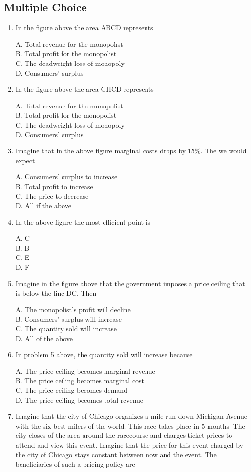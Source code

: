 \documentclass[
]{book}
\begin{document}
\hypertarget{multiple-choice-6}{%
\subsection{Multiple Choice}\label{multiple-choice-6}}

\begin{enumerate}
\def\labelenumi{\arabic{enumi}.}
\item
  In the figure above the area ABCD represents

  A. Total revenue for the monopolist\\
  B. Total profit for the monopolist\\
  C. The deadweight loss of monopoly\\
  D. Consumers' surplus
\item
  In the figure above the area GHCD represents

  A. Total revenue for the monopolist\\
  B. Total profit for the monopolist\\
  C. The deadweight loss of monopoly\\
  D. Consumers' surplus
\item
  Imagine that in the above figure marginal costs drops by 15\%. The we would expect

  A. Consumers' surplus to increase\\
  B. Total profit to increase\\
  C. The price to decrease\\
  D. All if the above
\item
  In the above figure the most efficient point is

  A. C\\
  B. B\\
  C. E\\
  D. F
\item
  Imagine in the figure above that the government imposes a price ceiling that is below the line DC. Then

  A. The monopolist's profit will decline\\
  B. Consumers' surplus will increase\\
  C. The quantity sold will increase\\
  D. All of the above
\item
  In problem 5 above, the quantity sold will increase because

  A. The price ceiling becomes marginal revenue\\
  B. The price ceiling becomes marginal cost\\
  C. The price ceiling becomes demand\\
  D. The price ceiling becomes total revenue
\item
  Imagine that the city of Chicago organizes a mile run down Michigan Avenue with the six best milers of the world. This race takes place in 5 months. The city closes of the area around the racecourse and charges ticket prices to attend and view this event. Imagine that the price for this event charged by the city of Chicago stays constant between now and the event. The beneficiaries of such a pricing policy are


\end{enumerate}
\end{document}
